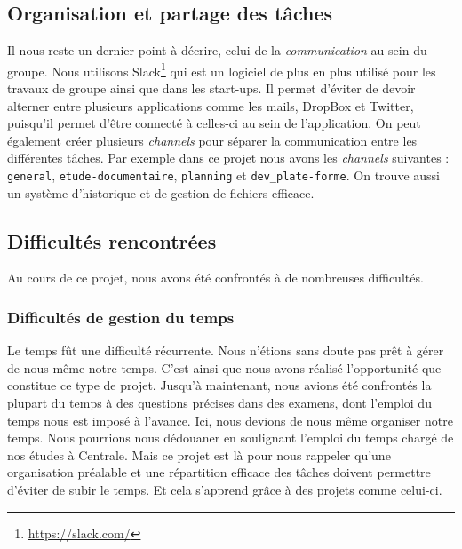 \subsection{Organisation et partage des tâches}
Il nous reste un dernier point à décrire, celui de la \emph{communication}
au sein du groupe.
Nous utilisons Slack\footnote{\url{https://slack.com/}} qui est un logiciel
de plus en plus utilisé pour les travaux de groupe ainsi que dans les start-ups.
Il permet d'éviter de devoir alterner entre plusieurs applications comme les mails,
DropBox et Twitter, puisqu'il permet d'être connecté
à celles-ci au sein de l'application.
On peut également créer plusieurs \emph{channels} pour séparer la communication
entre les différentes tâches.
Par exemple dans ce projet nous avons les \emph{channels} suivantes :
\texttt{general}, \texttt{etude-documentaire}, 
\texttt{planning} et \texttt{dev\_plate-forme}.
On trouve aussi un système d'historique et de gestion de fichiers efficace.

%
%


\subsection{Difficultés rencontrées}

Au cours de ce projet, nous avons été confrontés à de nombreuses difficultés.

\subsubsection{Difficultés de gestion du temps}



Le temps fût une difficulté récurrente. Nous n'étions sans doute pas prêt à gérer de nous-même notre temps. C'est ainsi que nous avons réalisé l'opportunité que constitue ce type de projet. 
Jusqu'à maintenant, nous avions été confrontés la plupart du temps à des questions précises dans des examens, dont l'emploi du temps nous est imposé à l'avance. 
Ici, nous devions de nous même organiser notre temps. 
Nous pourrions nous dédouaner en soulignant l'emploi du temps chargé de nos études à Centrale. 
Mais ce projet est là pour nous rappeler qu'une organisation préalable et une répartition efficace des tâches doivent permettre d'éviter de subir le temps. Et cela s'apprend grâce à des projets comme celui-ci.

